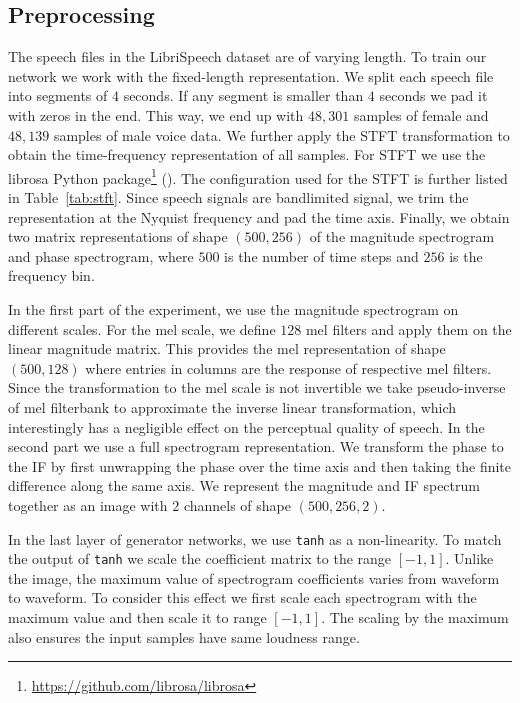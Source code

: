 \subsection{Preprocessing}
\label{subsec:preprocess}
The speech files in the LibriSpeech dataset are of varying length. To train our network we work with the fixed-length representation. We split each speech file into segments of $4$ seconds. If any segment is smaller than $4$ seconds we pad it with zeros in the end. This way, we end up with $48,301$ samples of female and $48,139$ samples of male voice data. We further apply the STFT transformation to obtain the time-frequency representation of all samples. For STFT we use the librosa Python package\footnote{\url{https://github.com/librosa/librosa}} (\cite{mcfee2015librosa}). The configuration used for the STFT is further listed in Table~\ref{tab:stft}. Since speech signals are bandlimited signal, we trim the representation at the Nyquist frequency and pad the time axis. Finally, we obtain two matrix representations of shape $(500,256)$ of the magnitude spectrogram and phase spectrogram, where $500$ is the number of time steps and $256$ is the frequency bin. 

In the first part of the experiment, we use the magnitude spectrogram on different scales. For the mel scale, we define $128$ mel filters and apply them on the linear magnitude matrix. This provides the mel representation of shape $(500,128)$ where entries in columns are the response of respective mel filters. Since the transformation to the mel scale is not invertible we take pseudo-inverse of mel filterbank to approximate the inverse linear transformation, which interestingly has a negligible effect on the perceptual quality of speech. In the second part we use a full spectrogram representation. We transform the phase to the IF by first unwrapping the phase over the time axis and then taking the finite difference along the same axis. We represent the magnitude and IF spectrum together as an image with $2$ channels of shape $(500,256,2)$. 

In the last layer of generator networks, we use \texttt{tanh} as a non-linearity. To match the output of \texttt{tanh} we scale the coefficient matrix to the range $[-1,1]$. Unlike the image, the maximum value of spectrogram coefficients varies from waveform to waveform. To consider this effect we first scale each spectrogram with the maximum value and then scale it to range  $[-1,1]$. The scaling by the maximum also ensures the input samples have same loudness range. 

